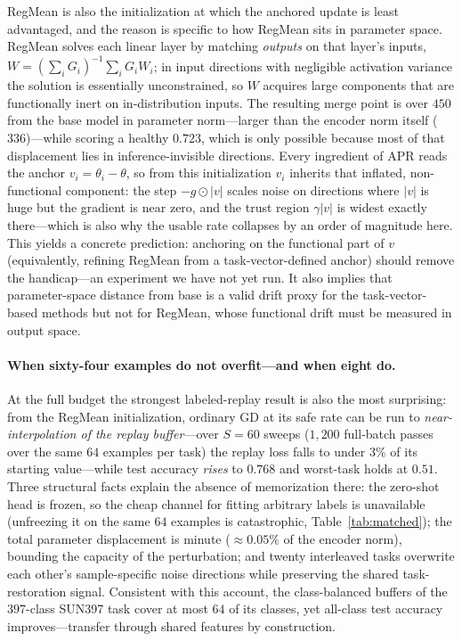 \documentclass[11pt]{article}
\begin{document}
RegMean is also the initialization at which the anchored update is least advantaged, and the reason is specific to how RegMean sits in parameter space. RegMean solves each linear layer by matching \emph{outputs} on that layer's inputs, $W=(\sum_i G_i)^{-1}\sum_i G_i W_i$; in input directions with negligible activation variance the solution is essentially unconstrained, so $W$ acquires large components that are functionally inert on in-distribution inputs. The resulting merge point is over $450$ from the base model in parameter norm---larger than the encoder norm itself ($336$)---while scoring a healthy $0.723$, which is only possible because most of that displacement lies in inference-invisible directions. Every ingredient of APR reads the anchor $v_i=\theta_i-\theta$, so from this initialization $v_i$ inherits that inflated, non-functional component: the step $-g\odot|v|$ scales noise on directions where $|v|$ is huge but the gradient is near zero, and the trust region $\gamma|v|$ is widest exactly there---which is also why the usable rate collapses by an order of magnitude here. This yields a concrete prediction: anchoring on the functional part of $v$ (equivalently, refining RegMean from a task-vector-defined anchor) should remove the handicap---an experiment we have not yet run. It also implies that parameter-space distance from base is a valid drift proxy for the task-vector-based methods but not for RegMean, whose functional drift must be measured in output space.

\paragraph{When sixty-four examples do not overfit---and when eight do.}
At the full budget the strongest labeled-replay result is also the most surprising: from the RegMean initialization, ordinary GD at its safe rate can be run to \emph{near-interpolation of the replay buffer}---over $S=60$ sweeps ($1{,}200$ full-batch passes over the same $64$ examples per task) the replay loss falls to under $3\%$ of its starting value---while test accuracy \emph{rises} to $0.768$ and worst-task holds at $0.51$. Three structural facts explain the absence of memorization there: the zero-shot head is frozen, so the cheap channel for fitting arbitrary labels is unavailable (unfreezing it on the same $64$ examples is catastrophic, Table~\ref{tab:matched}); the total parameter displacement is minute (${\approx}0.05\%$ of the encoder norm), bounding the capacity of the perturbation; and twenty interleaved tasks overwrite each other's sample-specific noise directions while preserving the shared task-restoration signal. Consistent with this account, the class-balanced buffers of the $397$-class SUN397 task cover at most $64$ of its classes, yet all-class test accuracy improves---transfer through shared features by construction.
\end{document}
